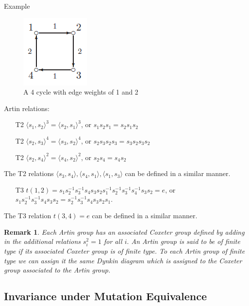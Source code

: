 \documentclass{beamer}
\newtheorem{rem}{Remark}
\begin{document}
\begin{frame}{Example}
\begin{figure}
\centering
\includegraphics[scale=.5]{4cycle.PNG}
\caption{A 4 cycle with edge weights of 1 and 2}
\end{figure}

\small
Artin relations:
\begin{itemize}
\item[T2] $\langle s_1, s_2 \rangle ^3 = \langle s_2, s_1 \rangle ^3$, or $s_1s_2s_1 = s_2s_1s_2$
\item[T2] $\langle s_2, s_3 \rangle ^4 = \langle s_3, s_2 \rangle ^4$, or $s_2s_3s_2s_3 = s_3s_2s_3s_2$
\item[T2] $\langle s_2, s_4 \rangle ^2 = \langle s_4, s_2 \rangle ^2$, or $s_2s_4 = s_4s_2$
\end{itemize}
The T2 relations $\langle s_3, s_4 \rangle, \langle s_4, s_1 \rangle, \langle s_1, s_3 \rangle$ can be defined in a similar manner.
\begin{itemize}
\item[T3] $t(1,2) = s_1s_2^{-1}s_3^{-1}s_4s_3s_2s_1^{-1}s_2^{-1}s_3^{-1}s_4^{-1}s_3s_2 = e$, or $s_1s_2^{-1}s_3^{-1}s_4s_3s_2 = s_2^{-1}s_3^{-1}s_4s_3s_2s_1$.
\end{itemize}

The T3 relation $t(3,4) = e$ can be defined in a similar manner.
\end{frame}



\begin{frame}
\begin{rem}
Each Artin group has an associated Coxeter group defined by adding in the additional relations $s_i^2 = 1$ for all $i.$ An Artin group is said to be of {\it finite type} if its associated Coxeter group is of finite type. To each Artin group of finite type we can assign it the same Dynkin diagram which is assigned to the Coxeter group associated to the Artin group.
\end{rem}
\end{frame}

\subsection{Invariance under Mutation Equivalence}
\end{document}
